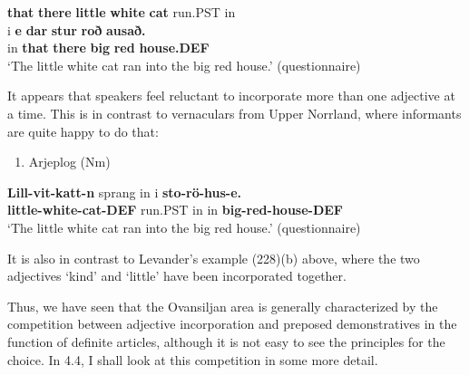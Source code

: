 \textbf{that} \textbf{there} \textbf{little} \textbf{white} \textbf{cat} run.PST  in\\ %


\ea\label{}
\gll i  \textbf{e}\textbf{  dar}\textbf{  stur}\textbf{  roð}\textbf{  ausað.}\\


in  \textbf{that} \textbf{there} \textbf{big} \textbf{red} \textbf{house.DEF}\\ %


‘The little white cat ran into the big red house.’ (questionnaire)
\z


It appears that speakers feel reluctant to incorporate more than one adjective at a time. This is in contrast to vernaculars from Upper Norrland, where informants are quite happy to do that:

\begin{enumerate} %
\item 
Arjeplog (Nm)

\end{enumerate} %
\ea\label{}
\gll \textbf{Lill-vit-katt-n} sprang  in  i  \textbf{sto-rö-hus-e.}\\


\textbf{little-white-cat-DEF} run.PST  in  in  \textbf{big-red-house-DEF}\\ %


‘The little white cat ran into the big red house.’ (questionnaire)
\z


It is also in contrast to Levander’s example (228)(b) above, where the two adjectives  ‘kind’ and  ‘little’ have been incorporated together. 

Thus, we have seen that the Ovansiljan area is generally characterized by the competition between adjective incorporation and preposed demonstratives in the function of definite articles, although it is not easy to see the principles for the choice. In 4.4, I shall look at this competition in some more detail.

